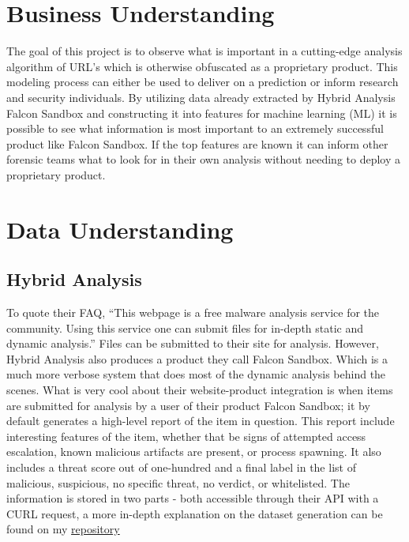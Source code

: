 \documentclass[conference]{IEEEtran}
\begin{document}
\section{Business Understanding}

The goal of this project is to observe what is important in a cutting-edge analysis algorithm of URL's which is otherwise obfuscated as a proprietary product. This modeling process can either be used to deliver on a prediction or inform research and security individuals. By utilizing data already extracted by Hybrid Analysis Falcon Sandbox and constructing it into features for machine learning (ML) it is possible to see what information is most important to an extremely successful product like Falcon Sandbox. If the top features are known it can inform other forensic teams what to look for in their own analysis without needing to deploy a proprietary product. 

\section{Data Understanding}

\subsection{Hybrid Analysis}

To quote their FAQ, “This webpage is a free malware analysis service for the community. Using this service one can submit files for in-depth static and dynamic analysis.”  Files can be submitted to their site for analysis. However, Hybrid Analysis also produces a product they call Falcon Sandbox. Which is a much more verbose system that does most of the dynamic analysis behind the scenes. What is very cool about their website-product integration is when items are submitted for analysis by a user of their product Falcon Sandbox; it by default generates a high-level report of the item in question. This report include interesting features of the item, whether that be signs of attempted access escalation, known malicious artifacts are present, or process spawning. It also includes a threat score out of one-hundred and a final label in the list of malicious, suspicious, no specific threat, no verdict, or whitelisted. The information is stored in two parts - both accessible through their API with a CURL request, a more in-depth explanation on the dataset generation can be found on my \href{https://github.com/bdjulian/url-threatscore-project}{repository}
\end{document}
